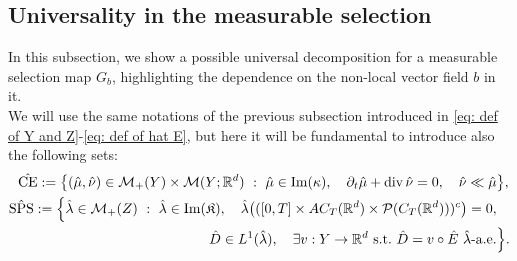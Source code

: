 \documentclass[10pt,leqno]{amsart}
\numberwithin{equation}{section}
\newcommand{\R}{\mathbb{R}}
\newcommand{\PP}{\mathcal{P}}
\begin{document}
\subsection{Universality in the measurable selection}\label{subsec: universal}

In this subsection, we show a possible universal decomposition for a measurable selection map $G_b$, highlighting the dependence on the non-local vector field $b$ in it. 
\\
We will use the same notations of the previous subsection introduced in \eqref{eq: def of Y and Z}-\eqref{eq: def of hat E}, but here it will be fundamental to introduce also the following sets:
\begin{equation}
    \begin{aligned}
        \hat{\operatorname{CE}}:= \big\{(\hat{\mu},\hat{\nu}) \in \mathcal{M}_+(Y)\times \mathcal{M}(Y;\R^d) \ : \ \hat{\mu} \in \operatorname{Im}(\kappa), \quad \partial_t\hat{\mu} + \operatorname{div}\hat{\nu} = 0, \quad \hat{\nu} \ll \hat{\mu} & \big\},
        \\
        \hat{\operatorname{SPS}} :=\Big\{ \hat{\lambda}\in \mathcal{M}_+(Z) \ : \ \hat{\lambda} \in \operatorname{Im}(\mathfrak{K}), \quad 
        \hat{\lambda} \big(([0,T] \times AC_T(\R^d) \times \PP(C_T(\R^d)))^c \big) =0,& 
        \\
        \hspace{3.8cm} \hat{D}\in L^1(\hat{\lambda}), \quad 
        \exists v: Y \to \R^d \ \text{s.t.} \ \hat{D} = v\circ \hat{E} \ \hat{\lambda}\text{-a.e.} & 
        \Big\}.
    \end{aligned}
\end{equation}
\end{document}
